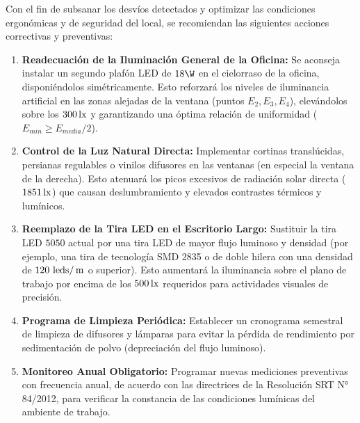 Con el fin de subsanar los desvíos detectados y optimizar las condiciones ergonómicas y de seguridad del local, se recomiendan las siguientes acciones correctivas y preventivas:

\begin{enumerate}
    \item \textbf{Readecuación de la Iluminación General de la Oficina:} Se aconseja instalar un segundo plafón LED de $18\W$ en el cielorraso de la oficina, disponiéndolos simétricamente. Esto reforzará los niveles de iluminancia artificial en las zonas alejadas de la ventana (puntos $E_2, E_3, E_4$), elevándolos sobre los $300\,\mathrm{lx}$ y garantizando una óptima relación de uniformidad ($E_{min} \ge E_{media}/2$).
    \item \textbf{Control de la Luz Natural Directa:} Implementar cortinas translúcidas, persianas regulables o vinilos difusores en las ventanas (en especial la ventana de la derecha). Esto atenuará los picos excesivos de radiación solar directa ($1851\,\mathrm{lx}$) que causan deslumbramiento y elevados contrastes térmicos y lumínicos.
    \item \textbf{Reemplazo de la Tira LED en el Escritorio Largo:} Sustituir la tira LED $5050$ actual por una tira LED de mayor flujo luminoso y densidad (por ejemplo, una tira de tecnología SMD 2835 o de doble hilera con una densidad de $120\text{ leds}/\,\mathrm{m}$ o superior). Esto aumentará la iluminancia sobre el plano de trabajo por encima de los $500\,\mathrm{lx}$ requeridos para actividades visuales de precisión.
    \item \textbf{Programa de Limpieza Periódica:} Establecer un cronograma semestral de limpieza de difusores y lámparas para evitar la pérdida de rendimiento por sedimentación de polvo (depreciación del flujo luminoso).
    \item \textbf{Monitoreo Anual Obligatorio:} Programar nuevas mediciones preventivas con frecuencia anual, de acuerdo con las directrices de la Resolución SRT N° 84/2012, para verificar la constancia de las condiciones lumínicas del ambiente de trabajo.
\end{enumerate}

